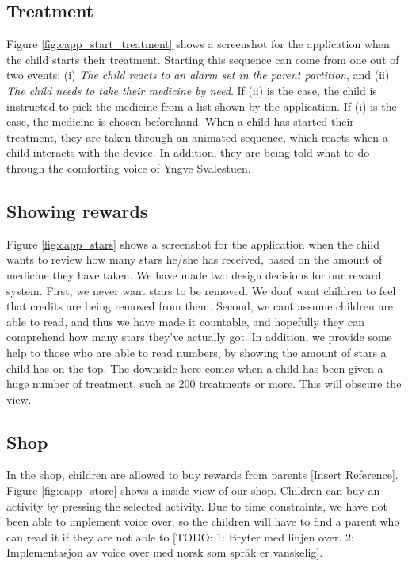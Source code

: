 \subsection{Treatment}
\label{sec:sec:description-treatment}
Figure \ref{fig:capp_start_treatment} shows a screenshot for the application when the child starts their treatment. Starting this sequence can come from one out of two events: (i) \emph{The child reacts to an alarm set in the parent partition}, and (ii) \emph{The child needs to take their medicine by need}. If (ii) is the case, the child is instructed to pick the medicine from a list shown by the application. If (i) is the case, the medicine is chosen beforehand. When a child has started their treatment, they are taken through an animated sequence, which reacts when a child interacts with the device. In addition, they are being told what to do through the comforting voice of Yngve Svalestuen.  


\subsection{Showing rewards}
\label{sec:description-show-rewards}
Figure \ref{fig:capp_stars} shows a screenshot for the application when the child wants to review how many stars he/she has received, based on the amount of medicine they have taken. We have made two design decisions for our reward system. First, we never want stars to be removed. We don\'t want children to feel that credits are being removed from them. Second, we can\'t assume children are able to read, and thus we have made it countable, and hopefully they can comprehend how many stars they've actually got. In addition, we provide some help to those who are able to read numbers, by showing the amount of stars a child has on the top. The downside here comes when a child has been given a huge number of treatment, such as 200 treatments or more. This will obscure the view.     

\subsection{Shop}
\label{sec:description-shop}
In the shop, children are allowed to buy rewards from parents [Insert Reference]. Figure \ref{fig:capp_store} shows a inside-view of our shop. Children can buy an activity by pressing the selected activity. Due to time constraints, we have not been able to implement voice over, so the children will have to find a parent who can read it if they are not able to [TODO: 1: Bryter med linjen over. 2: Implementasjon av voice over med norsk som språk er vanskelig]. 



